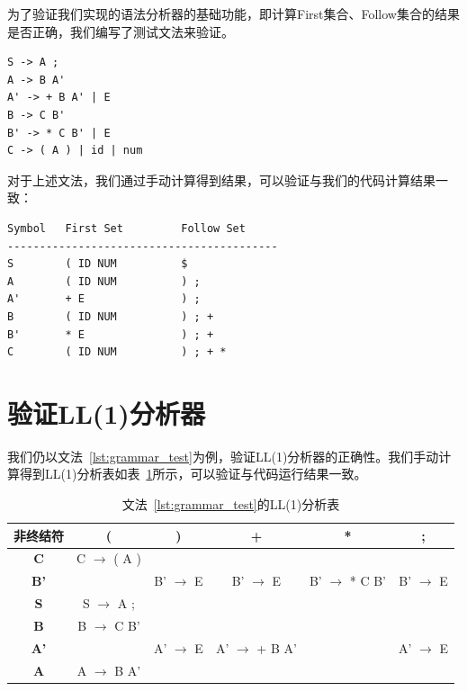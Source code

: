\documentclass[UTF8,openany]{ctexbook}
\begin{document}
为了验证我们实现的语法分析器的基础功能，即计算First集合、Follow集合的结果是否正确，我们编写了测试文法来验证。

\begin{lstlisting}[caption={测试文法},label={lst:grammar_test}]
S -> A ;
A -> B A'
A' -> + B A' | E
B -> C B'
B' -> * C B' | E
C -> ( A ) | id | num
\end{lstlisting}

对于上述文法，我们通过手动计算得到结果，可以验证与我们的代码计算结果一致：

\begin{lstlisting}[caption={First集与Follow集},label={lst:first_follow}]
Symbol   First Set         Follow Set
------------------------------------------
S        ( ID NUM          $
A        ( ID NUM          ) ;
A'       + E               ) ;
B        ( ID NUM          ) ; +
B'       * E               ) ; +
C        ( ID NUM          ) ; + *
\end{lstlisting}

\section{验证LL(1)分析器}

我们仍以文法~\ref{lst:grammar_test}为例，验证LL(1)分析器的正确性。我们手动计算得到LL(1)分析表如表~\ref{tab:parse-table}所示，可以验证与代码运行结果一致。

\begin{table}[H]
    \small
    \centering
    \caption{文法~\ref{lst:grammar_test}的LL(1)分析表}
    \label{tab:parse-table}
    \begin{tabular}{|c|c|c|c|c|c|}
        \hline
        \textbf{非终结符} & \textbf{(} & \textbf{)} & \textbf{+} & \textbf{*} & \textbf{;} \\
        \hline
        \textbf{C} & C $\to$ ( A ) & & & & \\
        \hline
        \textbf{B'} & & B' $\to$ E & B' $\to$ E & B' $\to$ * C B' & B' $\to$ E \\
        \hline
        \textbf{S} & S $\to$ A ; & & & & \\
        \hline
        \textbf{B} & B $\to$ C B' & & & & \\
        \hline
        \textbf{A'} & & A' $\to$ E & A' $\to$ + B A' & & A' $\to$ E\\
        \hline
        \textbf{A} & A $\to$ B A' & & & & \\
        \hline
    \end{tabular}
\end{table}
\end{document}
